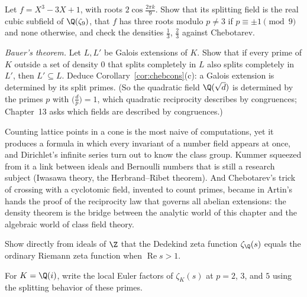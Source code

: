 \begin{exercise}[$\star\star$]\label{ex:cycliccubic}
Let $f=X^3-3X+1$, with roots $2\cos\frac{2\pi k}9$. Show that its splitting field is the real cubic subfield of $\Q(\zeta_9)$, that $f$ has three roots
modulo $p\ne3$ if $p\equiv\pm1\pmod9$ and none otherwise, and check the densities $\frac13$, $\frac23$ against Chebotarev.
\end{exercise}

\begin{exercise}[$\star\star\star$]\label{ex:bauer}
\emph{Bauer's theorem.} Let $L,L'$ be Galois extensions of $K$. Show that if every prime of $K$ outside a set of density $0$ that splits completely in
$L$ also splits completely in $L'$, then $L'\subseteq L$. Deduce Corollary~\ref{cor:chebcons}(c): a Galois extension is determined by its split
primes. (So the quadratic field $\Q(\sqrt d)$ is determined by the primes $p$ with $\bigl(\frac dp\bigr)=1$, which quadratic reciprocity describes by
congruences; Chapter~13 asks which fields are described by congruences.)
\end{exercise}

\begin{beauty}
Counting lattice points in a cone is the most naive of computations, yet it produces a formula in which every invariant of a number field
appears at once, and Dirichlet's infinite series turn out to know the class group. Kummer squeezed from it a link between ideals and Bernoulli
numbers that is still a research subject (Iwasawa theory, the Herbrand--Ribet theorem). And Chebotarev's trick of crossing with a cyclotomic field,
invented to count primes, became in Artin's hands the proof of the reciprocity law that governs all abelian extensions: the density theorem is
the bridge between the analytic world of this chapter and the algebraic world of class field theory.
\end{beauty}

\begin{exercise}[$\star$]\label{ex:v13-extra-11-1}
Show directly from ideals of $\Z$ that the Dedekind zeta function $\zeta_{\Q}(s)$ equals the ordinary Riemann zeta function when $\operatorname{Re}s>1$.
\end{exercise}

\begin{exercise}[$\star$]\label{ex:v13-extra-11-2}
For $K=\Q(i)$, write the local Euler factors of $\zeta_K(s)$ at $p=2$, $3$, and $5$ using the splitting behavior of these primes.
\end{exercise}

